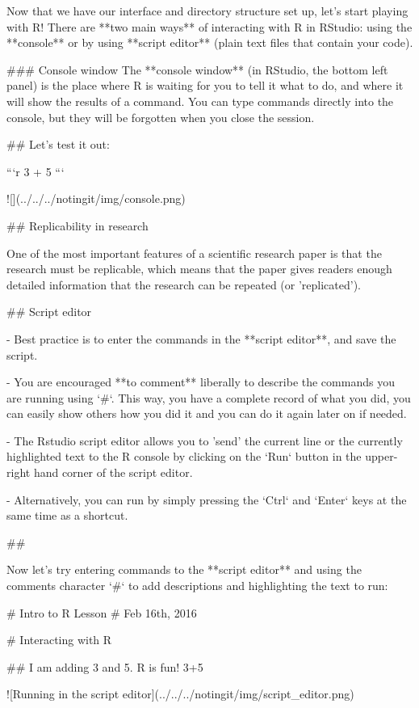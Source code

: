 Now that we have our interface and directory structure set up, let's start playing with R! There are **two main ways** of interacting with R in RStudio: using the **console** or by using **script editor** (plain text files that contain your code).

### Console window
The **console window** (in RStudio, the bottom left panel) is the place where R is waiting for you to tell it what to do, and where it will show the results of a command.  You can type commands directly into the console, but they will be forgotten when you close the session. 

## Let's test it out:

```r
3 + 5
```

![](../../../notingit/img/console.png)

## Replicability in research

One of the most important features of a scientific research paper is that the research must be replicable, which means that the paper gives readers enough detailed information that the research can be repeated (or 'replicated').

## Script editor

- Best practice is to enter the commands in the **script editor**, and save the script. 

- You are encouraged **to comment** liberally to describe the commands you are running using `#`. This way, you have a complete record of what you did, you can easily show others how you did it and you can do it again later on if needed. 

- The Rstudio script editor allows you to 'send' the current line or the currently highlighted text to the R console by clicking on the `Run` button in the upper-right hand corner of the script editor. 

- Alternatively, you can run by simply pressing the `Ctrl` and `Enter` keys at the same time as a shortcut.

## 

Now let's try entering commands to the **script editor** and using the comments character `#` to add descriptions and highlighting the text to run:
	
	# Intro to R Lesson
	# Feb 16th, 2016

	# Interacting with R
	
	## I am adding 3 and 5. R is fun!
	3+5

![Running in the script editor](../../../notingit/img/script_editor.png)

